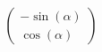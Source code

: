 \documentclass[preview]{standalone}
\begin{document}
\begin{align*}
\begin{pmatrix} -\sin(\alpha) \\ \cos(\alpha) \end{pmatrix}
\end{align*}
\end{document}
